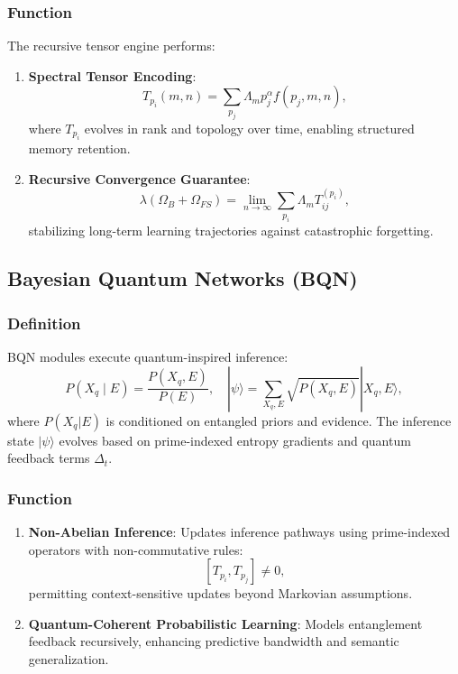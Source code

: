 \documentclass{article}
\theoremstyle{plain}
\theoremstyle{claimstyle}
\begin{document}
\subsubsection{Function}

The recursive tensor engine performs:

\begin{enumerate}
    \item \textbf{Spectral Tensor Encoding}:
    \[
    T_{p_i}(m,n) = \sum_{p_j} \Lambda_m p_j^\alpha f(p_j, m, n),
    \]
    where $T_{p_i}$ evolves in rank and topology over time, enabling structured memory retention.
    
    \item \textbf{Recursive Convergence Guarantee}:
    \[
    \lambda(\Omega_B + \Omega_{FS}) = \lim_{n \to \infty} \sum_{p_i} \Lambda_m T_{ij}^{(p_i)},
    \]
    stabilizing long-term learning trajectories against catastrophic forgetting.
\end{enumerate}

\subsection{Bayesian Quantum Networks (BQN)}

\subsubsection{Definition}

BQN modules execute quantum-inspired inference:
\begin{equation}
P(X_q \mid E) = \frac{P(X_q, E)}{P(E)}, \quad |\psi\rangle = \sum_{X_q, E} \sqrt{P(X_q, E)} |X_q, E\rangle,
\end{equation}
where $P(X_q | E)$ is conditioned on entangled priors and evidence. The inference state $|\psi\rangle$ evolves based on prime-indexed entropy gradients and quantum feedback terms $\Delta_t$.

\subsubsection{Function}

\begin{enumerate}
    \item \textbf{Non-Abelian Inference}: Updates inference pathways using prime-indexed operators with non-commutative rules:
    \[
    [T_{p_i}, T_{p_j}] \neq 0,
    \]
    permitting context-sensitive updates beyond Markovian assumptions.
    
    \item \textbf{Quantum-Coherent Probabilistic Learning}: Models entanglement feedback recursively, enhancing predictive bandwidth and semantic generalization.
\end{enumerate}
\end{document}
